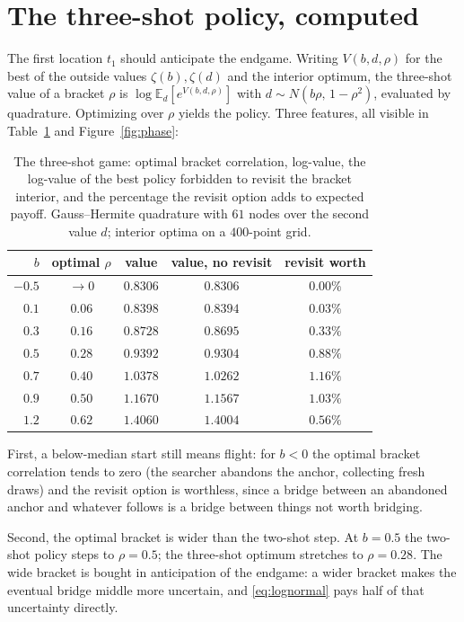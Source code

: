 \documentclass[11pt]{article}
\theoremstyle{itheads}
\newcommand{\E}{\mathbb{E}}
\begin{document}
\section{The three-shot policy, computed}

The first location $t_1$ should anticipate the endgame. Writing
$V(b,d,\rho)$ for the best of the outside values
$\zeta(b),\zeta(d)$ and the interior optimum, the three-shot value of a
bracket $\rho$ is
$\log \E_d\!\left[e^{V(b,d,\rho)}\right]$ with
$d\sim N(b\rho,\,1-\rho^{2})$, evaluated by quadrature. Optimizing over
$\rho$ yields the policy. Three features, all visible in
Table~\ref{tab:threeshot} and Figure~\ref{fig:phase}:

\begin{table}[t]
\centering
\begin{tabular}{rcccc}
\toprule
$b$ & optimal $\rho$ & value & value, no revisit & revisit worth \\
\midrule
$-0.5$ & $\to 0$ & $0.8306$ & $0.8306$ & $0.00\%$ \\
$0.1$ & $0.06$ & $0.8398$ & $0.8394$ & $0.03\%$ \\
$0.3$ & $0.16$ & $0.8728$ & $0.8695$ & $0.33\%$ \\
$0.5$ & $0.28$ & $0.9392$ & $0.9304$ & $0.88\%$ \\
$0.7$ & $0.40$ & $1.0378$ & $1.0262$ & $1.16\%$ \\
$0.9$ & $0.50$ & $1.1670$ & $1.1567$ & $1.03\%$ \\
$1.2$ & $0.62$ & $1.4060$ & $1.4004$ & $0.56\%$ \\
\bottomrule
\end{tabular}
\caption{The three-shot game: optimal bracket correlation, log-value,
the log-value of the best policy forbidden to revisit the bracket
interior, and the percentage the revisit option adds to expected payoff.
Gauss--Hermite quadrature with $61$ nodes over the second value $d$;
interior optima on a $400$-point grid.}
\label{tab:threeshot}
\end{table}

First, a below-median start still means flight: for $b<0$ the optimal
bracket correlation tends to zero (the searcher abandons the anchor,
collecting fresh draws) and the revisit option is worthless, since a
bridge between an abandoned anchor and whatever follows is a bridge
between things not worth bridging.

Second, the optimal bracket is wider than the two-shot step. At
$b=0.5$ the two-shot policy steps to $\rho=0.5$; the three-shot optimum
stretches to $\rho=0.28$. The wide bracket is bought in anticipation of
the endgame: a wider bracket makes the eventual bridge middle more
uncertain, and \eqref{eq:lognormal} pays half of that uncertainty
directly.
\end{document}
